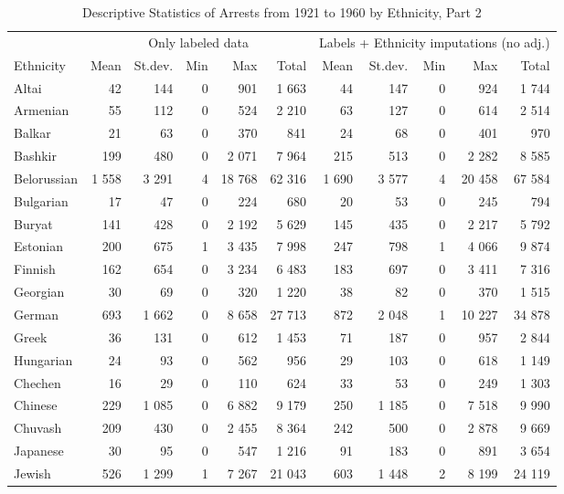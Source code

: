 \begin{table}[!h]

\caption{\label{tab:descr_stats_by_ethnicity}Descriptive Statistics of Arrests from 1921 to 1960 by Ethnicity, Part 2}
\centering
\fontsize{8}{10}\selectfont
\begin{tabular}{lrrrrrrrrrr}
\toprule
\multicolumn{1}{c}{ } & \multicolumn{5}{c}{Only labeled data} & \multicolumn{5}{c}{Labels + Ethnicity imputations (no adj.)} \\
\cmidrule(l{2pt}r{2pt}){2-6} \cmidrule(l{2pt}r{2pt}){7-11}
Ethnicity & Mean & St.dev. & Min & Max & Total & Mean & St.dev. & Min & Max & Total\\
\midrule
Altai & 42 & 144 & 0 & 901 & 1 663 & 44 & 147 & 0 & 924 & 1 744\\
Armenian & 55 & 112 & 0 & 524 & 2 210 & 63 & 127 & 0 & 614 & 2 514\\
Balkar & 21 & 63 & 0 & 370 & 841 & 24 & 68 & 0 & 401 & 970\\
Bashkir & 199 & 480 & 0 & 2 071 & 7 964 & 215 & 513 & 0 & 2 282 & 8 585\\
Belorussian & 1 558 & 3 291 & 4 & 18 768 & 62 316 & 1 690 & 3 577 & 4 & 20 458 & 67 584\\
Bulgarian & 17 & 47 & 0 & 224 & 680 & 20 & 53 & 0 & 245 & 794\\
Buryat & 141 & 428 & 0 & 2 192 & 5 629 & 145 & 435 & 0 & 2 217 & 5 792\\
Estonian & 200 & 675 & 1 & 3 435 & 7 998 & 247 & 798 & 1 & 4 066 & 9 874\\
Finnish & 162 & 654 & 0 & 3 234 & 6 483 & 183 & 697 & 0 & 3 411 & 7 316\\
Georgian & 30 & 69 & 0 & 320 & 1 220 & 38 & 82 & 0 & 370 & 1 515\\
German & 693 & 1 662 & 0 & 8 658 & 27 713 & 872 & 2 048 & 1 & 10 227 & 34 878\\
Greek & 36 & 131 & 0 & 612 & 1 453 & 71 & 187 & 0 & 957 & 2 844\\
Hungarian & 24 & 93 & 0 & 562 & 956 & 29 & 103 & 0 & 618 & 1 149\\
Chechen & 16 & 29 & 0 & 110 & 624 & 33 & 53 & 0 & 249 & 1 303\\
Chinese & 229 & 1 085 & 0 & 6 882 & 9 179 & 250 & 1 185 & 0 & 7 518 & 9 990\\
Chuvash & 209 & 430 & 0 & 2 455 & 8 364 & 242 & 500 & 0 & 2 878 & 9 669\\
Japanese & 30 & 95 & 0 & 547 & 1 216 & 91 & 183 & 0 & 891 & 3 654\\
Jewish & 526 & 1 299 & 1 & 7 267 & 21 043 & 603 & 1 448 & 2 & 8 199 & 24 119\\

\end{tabular}
\end{table}
